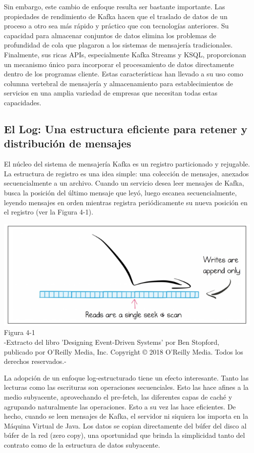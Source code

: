 \documentclass{article}
\begin{document}
Sin embargo, este cambio de enfoque resulta ser bastante importante. Las propiedades de rendimiento de Kafka hacen que el traslado de datos de un proceso a otro sea más rápido y práctico que con tecnologías anteriores. Su capacidad para almacenar conjuntos de datos elimina los problemas de profundidad de cola que plagaron a los sistemas de mensajería tradicionales. Finalmente, sus ricas APIs, especialmente Kafka Streams y KSQL, proporcionan un mecanismo único para incorporar el procesamiento de datos directamente dentro de los programas cliente. Estas características han llevado a su uso como columna vertebral de mensajería y almacenamiento para establecimientos de servicios en una amplia variedad de empresas que necesitan todas estas capacidades.

\subsection{El Log: Una estructura eficiente para retener y distribución de mensajes}
El núcleo del sistema de mensajería Kafka es un registro particionado y rejugable. La estructura de registro es una idea simple: una colección de mensajes, anexados secuencialmente a un archivo. Cuando un servicio desea leer mensajes de Kafka, busca la posición del último mensaje que leyó, luego escanea secuencialmente, leyendo mensajes en orden mientras registra periódicamente su nueva posición en el registro (ver la Figura 4-1).
\begin{center}
    \includegraphics[scale=0.8]{figure4.1.png}
    Figura 4-1\\
    -Extracto del libro 'Designing Event-Driven Systems' por Ben Stopford, publicado por O'Reilly Media, Inc. Copyright © 2018 O'Reilly Media. Todos los derechos reservados.-
\end{center}
La adopción de un enfoque log-estructurado tiene un efecto interesante. Tanto las lecturas como las escrituras son operaciones secuenciales. Esto las hace afines a la medio subyacente, aprovechando el pre-fetch, las diferentes capas de caché y agrupando naturalmente las operaciones. Esto a su vez las hace eficientes. De hecho, cuando se leen mensajes de Kafka, el servidor ni siquiera los importa en la Máquina Virtual de Java. Los datos se copian directamente del búfer del disco al búfer de la red (zero copy), una oportunidad que brinda la simplicidad tanto del contrato como de la estructura de datos subyacente.\\
\end{document}
